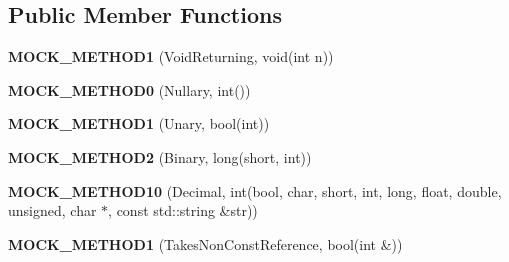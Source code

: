 \subsection*{Public Member Functions}
\begin{DoxyCompactItemize}
\item 
\mbox{\label{classtesting_1_1gmock__generated__function__mockers__test_1_1MockFoo_a03e7f723e9909b031fc6df22f41aac7f}} 
{\bfseries M\+O\+C\+K\+\_\+\+M\+E\+T\+H\+O\+D1} (Void\+Returning, void(int n))
\item 
\mbox{\label{classtesting_1_1gmock__generated__function__mockers__test_1_1MockFoo_a25b99ec3b994318b7ecb0578da113136}} 
{\bfseries M\+O\+C\+K\+\_\+\+M\+E\+T\+H\+O\+D0} (Nullary, int())
\item 
\mbox{\label{classtesting_1_1gmock__generated__function__mockers__test_1_1MockFoo_a9f9ce709a5b13e319eeb348e6eae3d18}} 
{\bfseries M\+O\+C\+K\+\_\+\+M\+E\+T\+H\+O\+D1} (Unary, bool(int))
\item 
\mbox{\label{classtesting_1_1gmock__generated__function__mockers__test_1_1MockFoo_a50f8c94d6fab258d49e1d4a15ea7a7af}} 
{\bfseries M\+O\+C\+K\+\_\+\+M\+E\+T\+H\+O\+D2} (Binary, long(short, int))
\item 
\mbox{\label{classtesting_1_1gmock__generated__function__mockers__test_1_1MockFoo_ab0a37a844eb43c36ca45cff5274bd9e9}} 
{\bfseries M\+O\+C\+K\+\_\+\+M\+E\+T\+H\+O\+D10} (Decimal, int(bool, char, short, int, long, float, double, unsigned, char $\ast$, const std\+::string \&str))
\item 
\mbox{\label{classtesting_1_1gmock__generated__function__mockers__test_1_1MockFoo_a785cbef820189a974170cea52b0d97d9}} 
{\bfseries M\+O\+C\+K\+\_\+\+M\+E\+T\+H\+O\+D1} (Takes\+Non\+Const\+Reference, bool(int \&))
\item 
\mbox{\label{classtesting_1_1gmock__generated__function__mockers__test_1_1MockFoo_a94d9e3801000de6dec4b4394a12a9349}} 

\end{DoxyCompactItemize}
